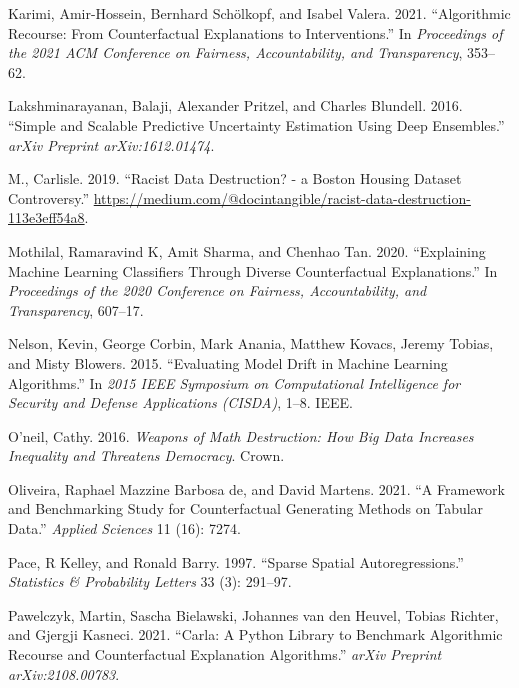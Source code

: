 \documentclass[conference,final,]{IEEEtran}
\newlength{\cslhangindent}
\newlength{\cslentryspacingunit} %
\newenvironment{CSLReferences}[2] %
 {%
  \setlength{\parindent}{0pt}
  \ifodd #1
  \let\oldpar\par
  \def\par{\hangindent=\cslhangindent\oldpar}
  \fi
  \setlength{\parskip}{#2\cslentryspacingunit}
 }%
 {}
\begin{document}
\begin{CSLReferences}{1}{0}
\leavevmode{}%
Karimi, Amir-Hossein, Bernhard Schölkopf, and Isabel Valera. 2021. {``Algorithmic Recourse: From Counterfactual Explanations to Interventions.''} In \emph{Proceedings of the 2021 ACM Conference on Fairness, Accountability, and Transparency}, 353--62.

\leavevmode{}%
Lakshminarayanan, Balaji, Alexander Pritzel, and Charles Blundell. 2016. {``Simple and Scalable Predictive Uncertainty Estimation Using Deep Ensembles.''} \emph{arXiv Preprint arXiv:1612.01474}.

\leavevmode{}%
M., Carlisle. 2019. {``Racist Data Destruction? - a Boston Housing Dataset Controversy.''} \url{https://medium.com/@docintangible/racist-data-destruction-113e3eff54a8}.

\leavevmode{}%
Mothilal, Ramaravind K, Amit Sharma, and Chenhao Tan. 2020. {``Explaining Machine Learning Classifiers Through Diverse Counterfactual Explanations.''} In \emph{Proceedings of the 2020 Conference on Fairness, Accountability, and Transparency}, 607--17.

\leavevmode{}%
Nelson, Kevin, George Corbin, Mark Anania, Matthew Kovacs, Jeremy Tobias, and Misty Blowers. 2015. {``Evaluating Model Drift in Machine Learning Algorithms.''} In \emph{2015 IEEE Symposium on Computational Intelligence for Security and Defense Applications (CISDA)}, 1--8. IEEE.

\leavevmode{}%
O'neil, Cathy. 2016. \emph{Weapons of Math Destruction: How Big Data Increases Inequality and Threatens Democracy}. Crown.

\leavevmode{}%
Oliveira, Raphael Mazzine Barbosa de, and David Martens. 2021. {``A Framework and Benchmarking Study for Counterfactual Generating Methods on Tabular Data.''} \emph{Applied Sciences} 11 (16): 7274.

\leavevmode{}%
Pace, R Kelley, and Ronald Barry. 1997. {``Sparse Spatial Autoregressions.''} \emph{Statistics \& Probability Letters} 33 (3): 291--97.

\leavevmode{}%
Pawelczyk, Martin, Sascha Bielawski, Johannes van den Heuvel, Tobias Richter, and Gjergji Kasneci. 2021. {``Carla: A Python Library to Benchmark Algorithmic Recourse and Counterfactual Explanation Algorithms.''} \emph{arXiv Preprint arXiv:2108.00783}.


\end{CSLReferences}
\end{document}
